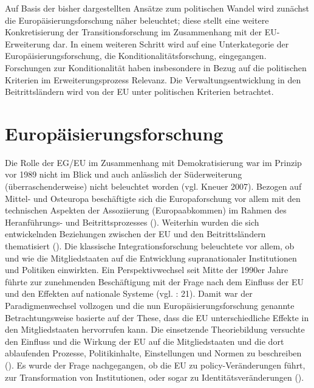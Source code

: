Auf Basis der bisher dargestellten Ansätze zum politischen Wandel wird zunächst die Europäisierungsforschung näher beleuchtet; diese stellt eine weitere Konkretisierung der Transitionsforschung im Zusammenhang mit der EU-Erweiterung dar. In einem weiteren Schritt wird auf eine Unterkategorie der Europäisierungsforschung, die Konditionalitätsforschung, eingegangen. Forschungen zur Konditionalität haben insbesondere in Bezug auf die politischen Kriterien im Erweiterungsprozess Relevanz. Die Verwaltungsentwicklung in den Beitrittsländern wird von der EU unter politischen Kriterien betrachtet. 
\section{Europäisierungsforschung}
Die Rolle der EG/EU im Zusammenhang mit Demokratisierung war im Prinzip vor 1989 nicht im Blick und auch anlässlich der Süderweiterung (überraschenderweise) nicht beleuchtet worden (vgl. Kneuer 2007). Bezogen auf Mittel- und Osteuropa beschäftigte sich die Europaforschung vor allem mit den technischen Aspekten der Assoziierung (Europaabkommen) im Rahmen des Heranführungs- und Beitrittsprozesses (\cite{lipbec, lipsch}). Weiterhin wurden die sich entwickelnden Beziehungen zwischen der EU und den Beitrittsländern thematisiert (\cite{mayhew, torre}). Die klassische Integrationsforschung beleuchtete vor allem, ob und wie die Mitgliedstaaten auf die Entwicklung supranationaler Institutionen und Politiken einwirkten. Ein Perspektivwechsel seit Mitte der 1990er Jahre führte zur zunehmenden Beschäftigung mit der Frage nach dem Einfluss der EU und den Effekten auf nationale Systeme (vgl. \cite{kneuer09} : 21). Damit war der Paradigmenwechsel vollzogen und die nun Europäisierungsforschung genannte Betrachtungsweise basierte auf der These, dass die EU unterschiedliche Effekte in den Mitgliedstaaten hervorrufen kann. Die einsetzende Theoriebildung versuchte den Einfluss und die Wirkung der EU auf die Mitgliedstaaten und die dort ablaufenden Prozesse, Politikinhalte, Einstellungen und Normen zu beschreiben (\cite{boerzel, boeris00, radaelli00, kohler, fearad03}). Es wurde der Frage nachgegangen, ob die EU zu policy-Veränderungen führt, zur Transformation von Institutionen, oder sogar zu Identitätsveränderungen (\cite{meny, knilen, fearad03, boeris07}). \par


